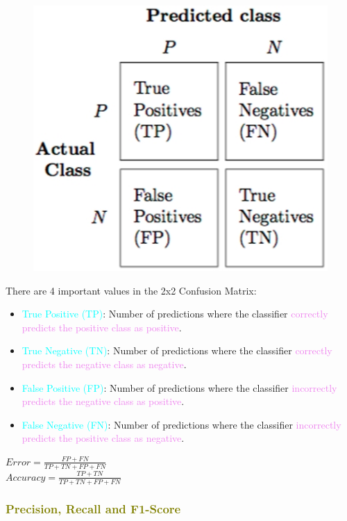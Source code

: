 \documentclass{book}
\begin{document}
\begin{figure}
    \centering
    \includegraphics[scale=0.2]{chapter 4/ch4_figure4.jpeg}
\end{figure}
There are 4 important values in the 2x2 Confusion Matrix:\\
\begin{itemize}
    \item \textcolor{cyan}{True Positive (TP)}: Number of predictions where the classifier \textcolor{violet}{correctly predicts the positive class as positive}.
    \item \textcolor{cyan}{True Negative (TN)}: Number of predictions where the classifier \textcolor{violet}{correctly predicts the negative class as negative}.
    \item \textcolor{cyan}{False Positive (FP)}: Number of predictions where the classifier \textcolor{violet}{incorrectly predicts the negative class as positive}.
    \item \textcolor{cyan}{False Negative (FN)}: Number of predictions where the classifier \textcolor{violet}{incorrectly predicts the positive class as negative}.
\end{itemize}
\(Error = \frac{FP + FN}{TP + TN + FP + FN}\)\\
\vspace{1mm}
\(Accuracy = \frac{TP + TN}{TP + TN + FP + FN}\)\\
\textcolor{olive}{\subsubsection{Precision, Recall and F1-Score}}
\end{document}
